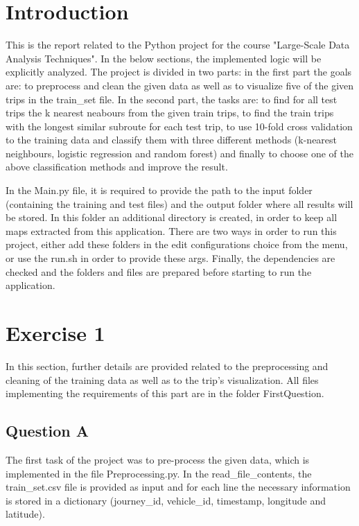 \documentclass[12pt]{article}
\begin{document}
	\section{Introduction}
    This is the report related to the Python project for the course "Large-Scale Data Analysis Techniques". In the below sections, the implemented logic will be explicitly analyzed. The project is divided in two parts: in the first part the goals are: to preprocess and clean the given data as well as to visualize five of the given trips in the train\_set file. In the second part, the tasks are: to find for all test trips the k nearest neabours from the given train trips, to find the train trips with the longest similar subroute for each test trip, to use 10-fold cross validation to the training data and classify them with three different methods (k-nearest neighbours, logistic regression and random forest) and finally to choose one of the above classification methods and improve the result.
    
    In the Main.py file, it is required to provide the path to the input folder (containing the training and test files) and the output folder where all results will be stored. In this folder an additional directory is created, in order to keep all maps extracted from this application. There are two ways in order to run this project, either add these folders in the edit configurations choice from the menu, or use the run.sh in order to provide these args. Finally, the dependencies are checked and the folders and files are prepared before starting to run the application.
    
	\section{Exercise 1}
	In this section, further details are provided related to the preprocessing and cleaning of the training data as well as to the trip's visualization. All files implementing the requirements of this part are in the folder FirstQuestion.
	
	\subsection{Question A}
	The first task of the project was to pre-process the given data, which is implemented in the file Preprocessing.py. In the read\_file\_contents, the train\_set.csv file is provided as input and for each line the necessary information is stored in a dictionary (journey\_id, vehicle\_id, timestamp, longitude and latitude).
	
\end{document}
